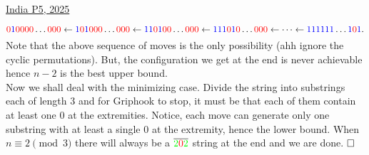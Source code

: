 \begin{problem}{2}{\href{https://artofproblemsolving.com/community/q1h3483100p34496847}{India P5, 2025}}
\begin{solution}
	$$\textcolor{red}{0}\textcolor{blue}{1}\textcolor{red}{0000}\ldots \textcolor{red}{000}\gets \textcolor{blue}{1}\textcolor{red}{0}\textcolor{blue}{1}\textcolor{red}{000}\ldots \textcolor{red}{000}\gets \textcolor{blue}{11}\textcolor{red}{0}\textcolor{blue}{1}\textcolor{red}{00}\ldots \textcolor{red}{000}\gets \textcolor{blue}{111}\textcolor{red}{0}\textcolor{blue}{1}\textcolor{red}{0}\ldots \textcolor{red}{000}\gets \cdots \gets \textcolor{blue}{111111}\ldots \textcolor{blue}{1}\textcolor{red}{0}\textcolor{blue}{1}.$$Note that the above sequence of moves is the only possibility (ahh ignore the cyclic permutations). But, the configuration we get at the end is never achievable hence $n-2$ is the best upper bound.\\
	\indent Now we shall deal with the minimizing case. Divide the string into substrings each of length $3$ and for Griphook to stop, it must be that each of them contain at least one $0$ at the extremities. Notice, each move can generate only one substring with at least a single $0$ at the extremity, hence the lower bound. When $n\equiv 2\pmod{3}$ there will always be a $\overline{\textcolor{green}{2}\textcolor{red}{0}\textcolor{green}{2}}$ string at the end and we are done. $\qedwhite$

	\end{solution}
\end{problem}

